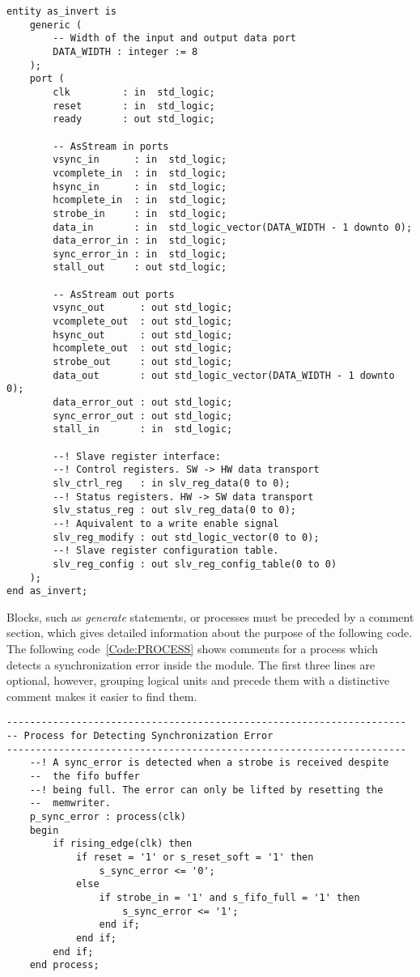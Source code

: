 \begin{lstlisting}[style=hdl, label=Code:ENTITY, caption=\asterics entity comments]
entity as_invert is
    generic (
        -- Width of the input and output data port
        DATA_WIDTH : integer := 8
    );
    port (
        clk         : in  std_logic;
        reset       : in  std_logic;
        ready       : out std_logic;

        -- AsStream in ports
        vsync_in      : in  std_logic;
        vcomplete_in  : in  std_logic;
        hsync_in      : in  std_logic;
        hcomplete_in  : in  std_logic;
        strobe_in     : in  std_logic;
        data_in       : in  std_logic_vector(DATA_WIDTH - 1 downto 0);
        data_error_in : in  std_logic;
        sync_error_in : in  std_logic;
        stall_out     : out std_logic;

        -- AsStream out ports
        vsync_out      : out std_logic;
        vcomplete_out  : out std_logic;
        hsync_out      : out std_logic;
        hcomplete_out  : out std_logic;
        strobe_out     : out std_logic;
        data_out       : out std_logic_vector(DATA_WIDTH - 1 downto 0);
        data_error_out : out std_logic;
        sync_error_out : out std_logic;
        stall_in       : in  std_logic;

        --! Slave register interface:
        --! Control registers. SW -> HW data transport
        slv_ctrl_reg   : in slv_reg_data(0 to 0);
        --! Status registers. HW -> SW data transport
        slv_status_reg : out slv_reg_data(0 to 0);
        --! Aquivalent to a write enable signal
        slv_reg_modify : out std_logic_vector(0 to 0);
        --! Slave register configuration table.
        slv_reg_config : out slv_reg_config_table(0 to 0)
    );
end as_invert;
\end{lstlisting}

Blocks, such as \textit{generate} statements, or processes must be preceded by a comment section, which gives detailed information about the purpose of the following code.
The following code~\ref{Code:PROCESS} shows comments for a process which detects a synchronization error inside the module.
The first three lines are optional, however, grouping logical units and precede them with a distinctive comment makes it easier to find them.

\begin{lstlisting}[style=hdl, label=Code:PROCESS, caption=Exemplary comment for process]
---------------------------------------------------------------------
-- Process for Detecting Synchronization Error
---------------------------------------------------------------------
    --! A sync_error is detected when a strobe is received despite 
    --  the fifo buffer 
    --! being full. The error can only be lifted by resetting the 
    --  memwriter.
    p_sync_error : process(clk)
    begin
        if rising_edge(clk) then
            if reset = '1' or s_reset_soft = '1' then
                s_sync_error <= '0';
            else
                if strobe_in = '1' and s_fifo_full = '1' then
                    s_sync_error <= '1';
                end if;
            end if;
        end if;
    end process;
\end{lstlisting}

